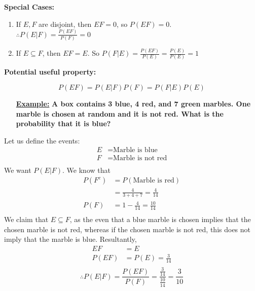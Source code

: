 \documentclass[10pt]{article}
\begin{document}
\begin{flushleft}
\textbf{Special Cases:}
\begin{enumerate}
    \item If $E,F$ are disjoint, then $EF = 0$, so $P(EF) = 0$. \\
        $\therefore P(E|F) = \frac{P(EF)}{P(F)} = 0$
    \item If $E \subseteq F$, then $EF = E$. So $P(F|E) = \frac{P(EF)}{P(E)} =
        \frac{P(E)}{P(E)} = 1$
\end{enumerate}

\textbf{Potential useful property:}
\end{flushleft}
$$ \boxed{P(EF) = P(E|F)P(F) = P(F|E)P(E)}$$

\begin{itemize}
    \item[\textbf{\underline{Example:}}] \textbf{A box contains 3 blue, 4 red,
            and 7
        green marbles. One marble is chosen at random and it is not red. What is
    the probability that it is blue?}
\end{itemize}
    Let us define the events:
        $$ \begin{aligned}
            E &= \text{Marble is blue}\\
            F &= \text{Marble is not red} \\
        \end{aligned} $$
        We want $P(E | F)$.
        We know that
        $$ \begin{aligned}
            P(F^c) &= P(\text{Marble is red})\\
                   &= \frac{4}{3 + 4 + 7} = \frac{4}{14} \\
            P(F) &= 1 - \frac{4}{14} = \frac{10}{14} \\
        \end{aligned} $$
        We claim that $E \subseteq F$, as the even that a blue marble is chosen
        implies that the chosen marble is not red, whereas if the chosen marble
        is not red, this does not imply that the marble is blue. Resultantly,
        $$ \begin{aligned} 
            EF &= E \\
            P(EF) &= P(E) = \frac{3}{14} \\
        \end{aligned}$$
        $$ \therefore P(E|F) = \frac{P(EF)}{P(F)} =
        \frac{\frac{3}{14}}{\frac{10}{14}} = \frac{3}{10}$$

        \newpage
\end{document}
